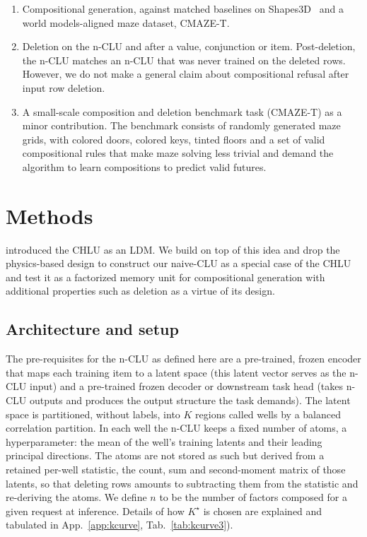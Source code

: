 \documentclass{article} %
\newcommand{\Kstar}{\ensuremath{K^{\star}}}
\begin{document}
\begin{enumerate}
\item Compositional generation, against matched baselines on
  Shapes3D~\citep{3dshapes18,kim_disentangling_2019} and a world models-aligned maze dataset, CMAZE-T.
\item Deletion on the n-CLU and after
  a value, conjunction or item. Post-deletion, the n-CLU matches an n-CLU that was never trained on the deleted rows. However, we do not make a general claim about compositional refusal after input row deletion. 
\item A small-scale composition and deletion benchmark task (CMAZE-T) as a minor contribution. The benchmark consists of randomly generated maze grids, with colored doors, colored keys, tinted floors and a set of valid compositional rules that make maze solving less trivial and demand the algorithm to learn compositions to predict valid futures.
\end{enumerate}

\section{Methods}
\label{sec:object}

\citet{jawahar2026chlu} introduced the CHLU as an LDM. We build on top of this idea and drop the physics-based design to construct our naive-CLU as a special case of the CHLU and test it as a factorized memory unit for compositional generation with additional properties such as deletion as a virtue of its design.

\subsection{Architecture and setup} 
The pre-requisites for the n-CLU as defined here are a pre-trained, frozen encoder that maps each training item to a latent space (this latent vector serves as the n-CLU input) and a pre-trained frozen decoder or downstream task head (takes n-CLU outputs and produces the output structure the task demands). The latent space is partitioned, without labels, into $K$ regions called wells by a balanced correlation partition. In each well the n-CLU keeps a fixed number of atoms, a hyperparameter: the mean of the well’s training latents and their leading principal directions. The atoms are not stored as such but derived from a retained per-well statistic, the count, sum and second-moment matrix of those latents, so that deleting rows amounts to subtracting them from the statistic and re-deriving the atoms. We define $n$ to be the number of factors composed for a given request at inference. Details of how $\Kstar$ is chosen are explained and tabulated in App.~\ref{app:kcurve}, Tab.~\ref{tab:kcurve3}).
\end{document}
